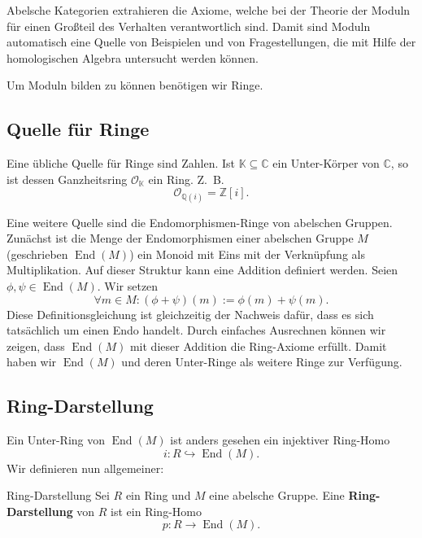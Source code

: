 \documentclass[a4paper]{amsart}
\theoremstyle{definition}
\DeclareMathOperator{\End}{End}
\newcommand{\Q}{\ensuremath{\mathbb{ Q }}}
\newcommand{\Z}{\ensuremath{\mathbb{ Z }}}
\newcommand{\C}{\ensuremath{\mathbb{ C }}}
\newcommand{\K}{\ensuremath{\mathbb{ K }}}
\begin{document}
Abelsche Kategorien extrahieren die Axiome, welche bei der Theorie der Moduln für einen Großteil des Verhalten verantwortlich sind. Damit sind Moduln automatisch eine Quelle von Beispielen und von Fragestellungen, die mit Hilfe der homologischen Algebra untersucht werden können.

Um Moduln bilden zu können benötigen wir Ringe.

\subsection{Quelle für Ringe}
Eine übliche Quelle für Ringe sind Zahlen. Ist $\K \subseteq \C$ ein Unter-Körper von $\C$, so ist dessen Ganzheitsring $\mathcal{O}_\K$ ein Ring. Z.~B.
\begin{equation}
   \mathcal{O}_{\Q(i)} = \Z[i].
\end{equation}

Eine weitere Quelle sind die Endomorphismen-Ringe von abelschen Gruppen. Zunächst ist die Menge der Endomorphismen einer abelschen Gruppe $M$ (geschrieben $\End(M)$) ein Monoid mit Eins mit der Verknüpfung als Multiplikation. Auf dieser Struktur kann eine Addition definiert werden. Seien $\phi, \psi \in \End(M)$. Wir setzen
\begin{equation}
   \forall m \in M \colon (\phi + \psi)(m) := \phi(m) + \psi(m).
\end{equation}
Diese Definitionsgleichung ist gleichzeitig der Nachweis dafür, dass es sich tatsächlich um einen Endo handelt.
Durch einfaches Ausrechnen können wir zeigen, dass $\End(M)$ mit dieser Addition die Ring-Axiome erfüllt.
Damit haben wir $\End(M)$ und deren Unter-Ringe als weitere Ringe zur Verfügung.

\subsection{Ring-Darstellung}
Ein Unter-Ring von $\End(M)$ ist anders gesehen ein injektiver Ring-Homo
\begin{equation}
   i \colon R 	\hookrightarrow \End(M).
\end{equation}
Wir definieren nun allgemeiner:
\begin{Definition}{Ring-Darstellung}
   Sei $R$ ein Ring und $M$ eine abelsche Gruppe. Eine \textbf{Ring-Darstellung} von $R$ ist ein Ring-Homo
   \begin{equation}
      p \colon R \to \End(M).
   \end{equation}
\end{Definition}
\end{document}
